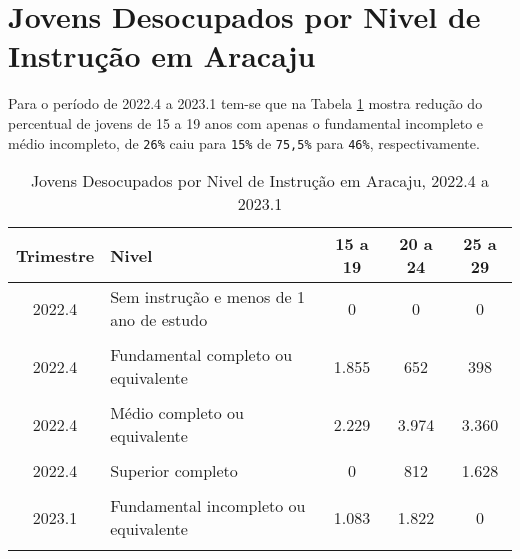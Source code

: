 \documentclass[preprint, 3p,
authoryear]{elsarticle} %
\begin{document}
\hypertarget{jovens-desocupados-por-nivel-de-instruuxe7uxe3o-em-aracaju}{%
\section{Jovens Desocupados por Nivel de Instrução em
Aracaju}\label{jovens-desocupados-por-nivel-de-instruuxe7uxe3o-em-aracaju}}

Para o período de 2022.4 a 2023.1 tem-se que na Tabela \ref{tab9} mostra
redução do percentual de jovens de 15 a 19 anos com apenas o fundamental
incompleto e médio incompleto, de \texttt{26\%} caiu para \texttt{15\%}
de \texttt{75,5\%} para \texttt{46\%}, respectivamente.

\begingroup\fontsize{9}{11}\selectfont

\begin{longtable}[t]{clccc}
\caption{\label{tab:tab9}\label{tab9}Jovens Desocupados por Nivel de Instrução em Aracaju, 2022.4 a 2023.1}\\
\toprule
Trimestre & Nivel & 15 a 19 & 20 a 24 & 25 a 29\\
\midrule
2022.4 & Sem instrução e menos de 1 ano de estudo & 0 & 0 & 0\\
\cellcolor[HTML]{DCDCDC}{2022.4} & \cellcolor[HTML]{DCDCDC}{Fundamental incompleto ou equivalente} & \cellcolor[HTML]{DCDCDC}{2.389} & \cellcolor[HTML]{DCDCDC}{1.159} & \cellcolor[HTML]{DCDCDC}{363}\\
2022.4 & Fundamental completo ou equivalente & 1.855 & 652 & 398\\
\cellcolor[HTML]{DCDCDC}{2022.4} & \cellcolor[HTML]{DCDCDC}{Médio incompleto ou equivalente} & \cellcolor[HTML]{DCDCDC}{2.610} & \cellcolor[HTML]{DCDCDC}{798} & \cellcolor[HTML]{DCDCDC}{868}\\
2022.4 & Médio completo ou equivalente & 2.229 & 3.974 & 3.360\\
\addlinespace
\cellcolor[HTML]{DCDCDC}{2022.4} & \cellcolor[HTML]{DCDCDC}{Superior incompleto ou equivalente} & \cellcolor[HTML]{DCDCDC}{0} & \cellcolor[HTML]{DCDCDC}{3.225} & \cellcolor[HTML]{DCDCDC}{2.369}\\
2022.4 & Superior completo & 0 & 812 & 1.628\\
\cellcolor[HTML]{DCDCDC}{2023.1} & \cellcolor[HTML]{DCDCDC}{Sem instrução e menos de 1 ano de estudo} & \cellcolor[HTML]{DCDCDC}{0} & \cellcolor[HTML]{DCDCDC}{873} & \cellcolor[HTML]{DCDCDC}{0}\\
2023.1 & Fundamental incompleto ou equivalente & 1.083 & 1.822 & 0\\
\cellcolor[HTML]{DCDCDC}{2023.1} & \cellcolor[HTML]{DCDCDC}{Fundamental completo ou equivalente} & \cellcolor[HTML]{DCDCDC}{885} & \cellcolor[HTML]{DCDCDC}{0} & \cellcolor[HTML]{DCDCDC}{0}\\

\end{longtable}
\end{document}
